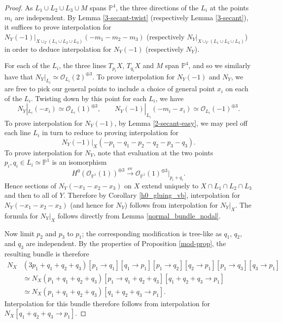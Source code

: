 \documentclass[11pt]{amsart}
\newcommand{\pp}{\mathbb{P}}
\renewcommand{\O}{\mathcal{O}}
\newcommand{\ev}{\operatorname{ev}}
\newcommand{\isabel}[1]{{\color{purple} ($\spadesuit$ Isabel: #1)}}
\theoremstyle{definition}
\theoremstyle{remark}
\begin{document}
\begin{proof}
As $L_1 \cup L_2 \cup L_3 \cup M$ spans $\pp^4$, the three directions of the $L_i$ at the points $m_i$ are independent.  
By Lemma \ref{3-secant-twist} (respectively Lemma \ref{3-secant}), it suffices to prove interpolation for $N_Y(-1)|_{X \cup_\Gamma (L_1 \cup L_2 \cup L_3)}(-m_1-m_2-m_3)$ (respectively $N_Y|_{X \cup_\Gamma (L_1 \cup L_2 \cup L_3)}$) in order to deduce interpolation for $N_Y(-1)$ (respectively $N_Y$).  

For each of the $L_i$, the three lines $T_{p_i}X$, $T_{q_i}X$ and $M$ span $\pp^4$,
and so we similarly have that $N_Y|_{L_i} \simeq \O_{L_i}(2)^{\oplus 3}$.  To prove interpolation for $N_Y(-1)$ and $N_Y$, we are free to pick our general points to include a choice of general point $x_i$ on each of the $L_i$.  Twisting down by this point for each $L_i$, we have
\[N_Y|_{L_i}(-x_i) \simeq \O_{L_i}(1)^{\oplus 3}, \qquad N_Y(-1)|_{L_i}(-m_i-x_i) \simeq \O_{L_i}(-1)^{\oplus 3}. \]
To prove interpolation for $N_Y(-1)$, by Lemma \ref{2-secant-easy}, we may peel off each line $L_i$ in turn to reduce to proving interpolation for
\[N_Y(-1)|_X(-p_1-q_1-p_2-q_2 -p_3-q_3). \]
To prove interpolation for $N_Y$, note that evaluation at the two points $p_i, q_i \in L_i \simeq \pp^1$ is an isomorphism
\[H^0(\O_{\pp^1}(1))^{\oplus 3} \xrightarrow{\ev} \O_{\pp^1}(1)^{\oplus 3}|_{p_i + q_i} .\]
Hence sections of $N_Y(-x_1-x_2-x_3)$ on $X$ extend uniquely to $X \cap L_1\cap L_2 \cap L_3$ and then to all of $Y$.   Therefore by Corollary \ref{h0_gluing_vb}, interpolation for $N_Y(-x_1-x_2-x_3)$ (and hence for $N_Y$) follows from interpolation for $N_Y|_X$.  The formula for $N_Y|_X$ follows directly from Lemma \ref{normal_bundle_nodal}.

Now limit $p_2$ and $p_3$ to $p_1$; the corresponding modification is tree-like as $q_1$, $q_2$,
and $q_3$ are independent.  By the properties of Proposition \ref{mod-prop}, the resulting bundle is therefore
\begin{align*}
N_X&(3p_1+q_1+q_2 +q_3)[p_1 \to q_1][q_1 \to p_1][p_1 \to q_2][q_2 \to p_1][p_1 \to q_3][q_3 \to p_1] \\
&\simeq N_X(p_1+q_1+q_2 +q_3)[p_1 \to q_1 + q_2 +q_3][q_1+q_2+q_3 \to p_1] \\
& \simeq  N_X(p_1+q_1+q_2 +q_3)[q_1+q_2+q_3 \to p_1].
\end{align*}
Interpolation for this bundle therefore follows from interpolation for $N_X[q_1+q_2+q_3 \to p_1]$.
\end{proof}
\end{document}
